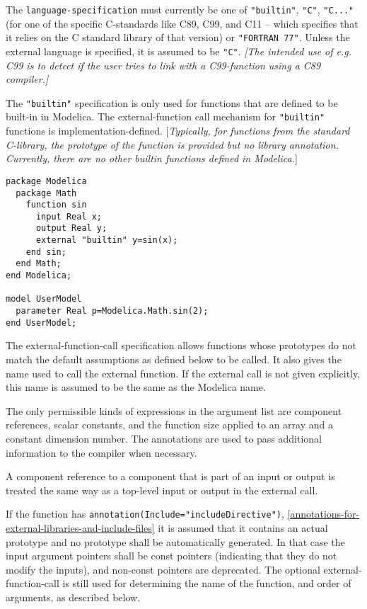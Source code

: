 The \lstinline!language-specification! must currently be one of \lstinline!"builtin"!,
\lstinline!"C"!, \lstinline!"C..."! (for one of the specific C-standards like C89, C99, and C11
-- which specifies that it relies on the C standard library of that
version) or \lstinline!"FORTRAN 77"!. Unless the external language is specified, it
is assumed to be \lstinline!"C"!. \emph{{[}The intended use of e.g. C99 is to
detect if the user tries to link with a C99-function using a C89
compiler.{]} }

The \lstinline!"builtin"! specification is only used for functions that are defined
to be built-in in Modelica. The external-function call mechanism for
\lstinline!"builtin"! functions is implementation-defined. {[}\emph{Typically, for
functions from the standard C-library, the prototype of the function is
provided but no library annotation. Currently, there are no other
builtin functions defined in Modelica.}{]}

\begin{example}
\begin{lstlisting}[language=modelica]
package Modelica
  package Math
    function sin
      input Real x;
      output Real y;
      external "builtin" y=sin(x);
    end sin;
  end Math;
end Modelica;

model UserModel
  parameter Real p=Modelica.Math.sin(2);
end UserModel;
\end{lstlisting}
\end{example}

The external-function-call specification allows functions whose
prototypes do not match the default assumptions as defined below to be
called. It also gives the name used to call the external function. If
the external call is not given explicitly, this name is assumed to be
the same as the Modelica name.

The only permissible kinds of expressions in the argument list are
component references, scalar constants, and the function size applied to
an array and a constant dimension number. The annotations are used to
pass additional information to the compiler when necessary.

A component reference to a component that is part of an input or output
is treated the same way as a top-level input or output in the external
call.

If the function has \lstinline!annotation(Include="includeDirective")!, \autoref{annotations-for-external-libraries-and-include-files}
it is assumed that it contains an actual prototype and no prototype shall be automatically generated.
In that case the input argument pointers shall be const pointers (indicating that they do not modify the inputs),
and non-const pointers are deprecated.
The optional external-function-call is still used for determining the name of the function, and order of arguments, as described below.

